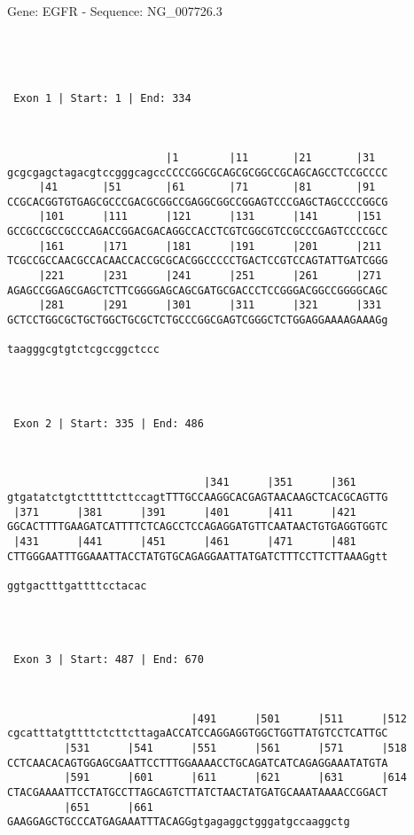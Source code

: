 \documentclass{article}
\begin{document}
\begin{center}
\begin{large}
 Gene: EGFR - Sequence: NG\_007726.3
\end{large}
\end{center}
 \begin{Verbatim}




 Exon 1 | Start: 1 | End: 334 



                         |1        |11       |21       |31  
gcgcgagctagacgtccgggcagccCCCCGGCGCAGCGCGGCCGCAGCAGCCTCCGCCCC
     |41       |51       |61       |71       |81       |91  
CCGCACGGTGTGAGCGCCCGACGCGGCCGAGGCGGCCGGAGTCCCGAGCTAGCCCCGGCG
     |101      |111      |121      |131      |141      |151 
GCCGCCGCCGCCCAGACCGGACGACAGGCCACCTCGTCGGCGTCCGCCCGAGTCCCCGCC
     |161      |171      |181      |191      |201      |211 
TCGCCGCCAACGCCACAACCACCGCGCACGGCCCCCTGACTCCGTCCAGTATTGATCGGG
     |221      |231      |241      |251      |261      |271 
AGAGCCGGAGCGAGCTCTTCGGGGAGCAGCGATGCGACCCTCCGGGACGGCCGGGGCAGC
     |281      |291      |301      |311      |321      |331 
GCTCCTGGCGCTGCTGGCTGCGCTCTGCCCGGCGAGTCGGGCTCTGGAGGAAAAGAAAGg
                        
taagggcgtgtctcgccggctccc




 Exon 2 | Start: 335 | End: 486 



                               |341      |351      |361     
gtgatatctgtctttttcttccagtTTTGCCAAGGCACGAGTAACAAGCTCACGCAGTTG
 |371      |381      |391      |401      |411      |421     
GGCACTTTTGAAGATCATTTTCTCAGCCTCCAGAGGATGTTCAATAACTGTGAGGTGGTC
 |431      |441      |451      |461      |471      |481     
CTTGGGAATTTGGAAATTACCTATGTGCAGAGGAATTATGATCTTTCCTTCTTAAAGgtt
                      
ggtgactttgattttcctacac




 Exon 3 | Start: 487 | End: 670 



                             |491      |501      |511      |512
cgcatttatgttttctcttcttagaACCATCCAGGAGGTGGCTGGTTATGTCCTCATTGC
         |531      |541      |551      |561      |571      |518
CCTCAACACAGTGGAGCGAATTCCTTTGGAAAACCTGCAGATCATCAGAGGAAATATGTA
         |591      |601      |611      |621      |631      |614
CTACGAAAATTCCTATGCCTTAGCAGTCTTATCTAACTATGATGCAAATAAAACCGGACT
         |651      |661                               
GAAGGAGCTGCCCATGAGAAATTTACAGGgtgagaggctgggatgccaaggctg





\end{Verbatim}
\end{document}
